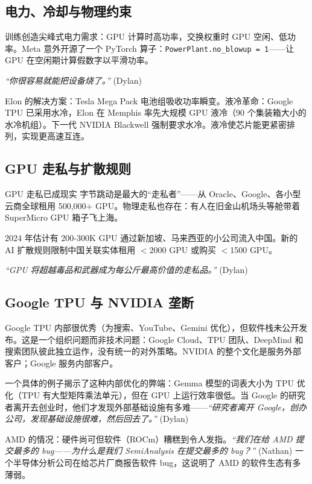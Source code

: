 \documentclass[a4paper]{article}
\begin{document}
\subsection{电力、冷却与物理约束}

训练创造尖峰式电力需求：GPU 计算时高功率，交换权重时 GPU 空闲、低功率。Meta 意外开源了一个 PyTorch 算子：\texttt{PowerPlant.no\_blowup = 1}——让 GPU 在空闲期计算假数字以平滑功率。

\textit{``你很容易就能把设备烧了。''} (Dylan)

Elon 的解决方案：Tesla Mega Pack 电池组吸收功率瞬变。液冷革命：Google TPU 已采用水冷，Elon 在 Memphis 率先大规模 GPU 液冷（90 个集装箱大小的水冷机组）。下一代 NVIDIA Blackwell 强制要求水冷。液冷使芯片能更紧密排列，实现更高速互连。

\subsection{GPU 走私与扩散规则}

\begin{warningbox}{GPU 走私已成现实}
字节跳动是最大的``走私者''——从 Oracle、Google、各小型云商全球租用 500,000+ GPU。物理走私也存在：有人在旧金山机场头等舱带着 SuperMicro GPU 箱子飞上海。

2024 年估计有 200-300K GPU 通过新加坡、马来西亚的小公司流入中国。新的 AI 扩散规则限制中国关联实体租用 $<$2000 GPU 或购买 $<$1500 GPU。

\textit{``GPU 将超越毒品和武器成为每公斤最高价值的走私品。''} (Dylan)
\end{warningbox}

\subsection{Google TPU 与 NVIDIA 垄断}

Google TPU 内部很优秀（为搜索、YouTube、Gemini 优化），但软件栈未公开发布。这是一个组织问题而非技术问题：Google Cloud、TPU 团队、DeepMind 和搜索团队彼此独立运作，没有统一的对外策略。NVIDIA 的整个文化是服务外部客户；Google 服务内部客户。

一个具体的例子揭示了这种内部优化的弊端：Gemma 模型的词表大小为 TPU 优化（TPU 有大型矩阵乘法单元），但在 GPU 上运行效率很低。当 Google 的研究者离开去创业时，他们才发现外部基础设施有多难——\textit{``研究者离开 Google，创办公司，发现基础设施很难，然后回去了。''} (Dylan)

AMD 的情况：硬件尚可但软件（ROCm）糟糕到令人发指。\textit{``我们在给 AMD 提交最多的 bug——为什么是我们 SemiAnalysis 在提交最多的 bug？''} (Nathan) 一个半导体分析公司在给芯片厂商报告软件 bug，这说明了 AMD 的软件生态有多薄弱。
\end{document}
